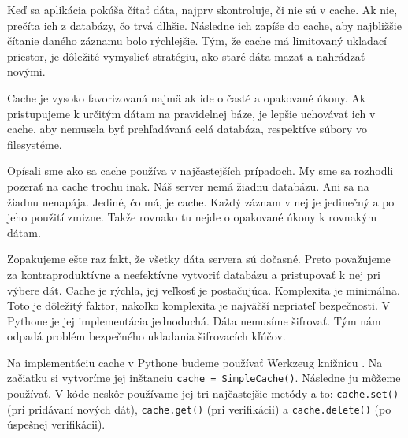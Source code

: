 Keď sa aplikácia pokúša čítať dáta, najprv skontroluje, či nie sú v cache. Ak nie, prečíta ich z databázy, čo trvá dlhšie. Následne ich zapíše do cache, aby najbližšie čítanie daného záznamu bolo rýchlejšie. Tým, že cache má limitovaný ukladací priestor, je dôležité vymyslieť stratégiu, ako staré dáta mazať a nahrádzať novými. 

Cache je vysoko favorizovaná najmä ak ide o časté a opakované úkony. Ak pristupujeme k určitým dátam na pravidelnej báze, je lepšie uchovávať ich v cache, aby nemusela byť prehľadávaná celá databáza, respektíve súbory vo filesystéme.

Opísali sme ako sa cache používa v najčastejších prípadoch. My sme sa rozhodli pozerať na cache trochu inak. Náš server nemá žiadnu databázu. Ani sa na žiadnu nenapája. Jediné, čo má, je cache. Každý záznam v nej je jedinečný a po jeho použití zmizne. Takže rovnako tu nejde o opakované úkony k rovnakým dátam. 

Zopakujeme ešte raz fakt, že všetky dáta servera sú dočasné. Preto považujeme za kontraproduktívne a neefektívne vytvoriť databázu a pristupovať k nej pri výbere dát. Cache je rýchla, jej veľkosť je postačujúca. Komplexita je minimálna. Toto je dôležitý faktor, nakoľko komplexita je najväčší nepriateľ bezpečnosti. V Pythone je jej implementácia jednoduchá. Dáta nemusíme šifrovať. Tým nám odpadá problém bezpečného ukladania šifrovacích kľúčov.

Na implementáciu cache v Pythone budeme používať Werkzeug knižnicu \cite{werkzeug_cache}. Na začiatku si vytvoríme jej inštanciu \texttt{cache = SimpleCache()}. Následne ju môžeme používať. V kóde neskôr používame jej tri najčastejšie metódy a to: \texttt{cache.set()} (pri pridávaní nových dát), \texttt{cache.get()} (pri verifikácii) a \texttt{cache.delete()} (po úspešnej verifikácii).
